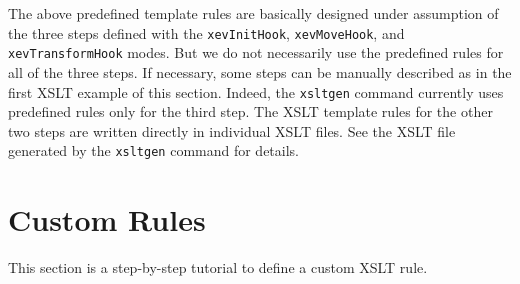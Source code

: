 The above predefined template rules are basically designed under
assumption of the three steps defined with the \texttt{xevInitHook},
\texttt{xevMoveHook}, and \texttt{xevTransformHook} modes. But we do not
necessarily use the predefined rules for all of the three steps.  If
necessary, some steps can be manually described as in the first XSLT
example of this section. Indeed, the \texttt{xsltgen} command currently
uses predefined rules only for the third step.  The XSLT template rules
for the other two steps are written directly in individual XSLT
files. See the XSLT file generated by the \texttt{xsltgen} command for
details.

\section{Custom Rules}\label{sec:custom}







This section is a step-by-step tutorial to define a custom XSLT rule.

